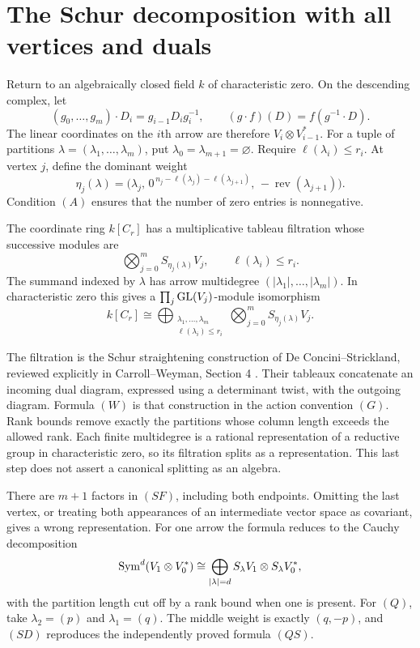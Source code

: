 \section{The Schur decomposition with all vertices and duals}

Return to an algebraically closed field \(k\)
of characteristic zero.  On the descending
complex, let
\[
 (g_0,\ldots,g_m)\cdot D_i
       =g_{i-1}D_i g_i^{-1},
 \qquad (g\cdot f)(D)=f(g^{-1}\cdot D).
 \tag{G}
\]
The linear coordinates on the \(i\)th arrow
are therefore \(V_i\otimes V_{i-1}^*\).
For a tuple of partitions
\(\lambda=(\lambda_1,\ldots,\lambda_m)\),
put \(\lambda_0=\lambda_{m+1}=\varnothing\).
Require \(\ell(\lambda_i)\le r_i\).
At vertex \(j\), define the dominant weight
\[
 \eta_j(\lambda)=
 \bigl(\lambda_j,\,
       0^{\,n_j-\ell(\lambda_j)-\ell(\lambda_{j+1})},\,
       -\operatorname{rev}(\lambda_{j+1})\bigr).
 \tag{W}
\]
Condition \((A)\) ensures that the number
of zero entries is nonnegative.

\begin{theorem}
The coordinate ring \(k[C_r]\) has a multiplicative
tableau filtration whose successive modules are
\[
 \bigotimes_{j=0}^m S_{\eta_j(\lambda)}V_j,
 \qquad \ell(\lambda_i)\le r_i.
 \tag{SF}
\]
The summand indexed by \(\lambda\) has arrow
multidegree \((|\lambda_1|,\ldots,|\lambda_m|)\).
In characteristic zero this gives a
\(\prod_j\operatorname{GL}(V_j)\)-module isomorphism
\[
 k[C_r]\cong
 \bigoplus_{\substack{\lambda_1,\ldots,\lambda_m\\
                     \ell(\lambda_i)\le r_i}}
          \bigotimes_{j=0}^m S_{\eta_j(\lambda)}V_j.
 \tag{SD}
\]
\end{theorem}

The filtration is the Schur straightening
construction of De Concini--Strickland,
reviewed explicitly in Carroll--Weyman,
Section 4 \cite{v2DS1981,smtCW2011}.
Their tableaux concatenate an incoming
dual diagram, expressed using a determinant
twist, with the outgoing diagram.
Formula \((W)\) is that construction in
the action convention \((G)\).
Rank bounds remove exactly the partitions
whose column length exceeds the allowed
rank.  Each finite multidegree is a
rational representation of a reductive
group in characteristic zero, so its
filtration splits as a representation.
This last step does not assert a
canonical splitting as an algebra.

There are \(m+1\) factors in \((SF)\),
including both endpoints.  Omitting the
last vertex, or treating both appearances
of an intermediate vector space as
covariant, gives a wrong representation.
For one arrow the formula reduces to
the Cauchy decomposition
\[
 \operatorname{Sym}^d(V_1\otimes V_0^*)
   \cong \bigoplus_{|\lambda|=d}
                   S_\lambda V_1\otimes S_\lambda V_0^*,
\]
with the partition length cut off by a
rank bound when one is present.
For \((Q)\), take \(\lambda_2=(p)\)
and \(\lambda_1=(q)\).  The middle
weight is exactly \((q,-p)\), and
\((SD)\) reproduces the independently
proved formula \((QS)\).

